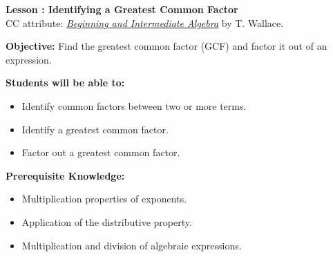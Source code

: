 \documentclass[12pt]{article}
\theoremstyle{definition}
\begin{document}
{\bf \large Lesson : Identifying a Greatest Common Factor}
\\ CC attribute: \href{http://www.wallace.ccfaculty.org/book/book.html}{\it{Beginning and Intermediate Algebra}} by T. Wallace. 
\hfill \doclicenseImage[imagewidth=5em]\\
\par
{\bf Objective:} Find the greatest common factor (GCF) and factor it out of an expression.\\
\par
{\bf Students will be able to:}
\begin{itemize}
	\item Identify common factors between two or more terms.
	\item Identify a greatest common factor.
	\item Factor out a greatest common factor.
\end{itemize}
{\bf Prerequisite Knowledge:}
\begin{itemize}
	\item Multiplication properties of exponents.
	\item Application of the distributive property.
	\item Multiplication and division of algebraic expressions.
\end{itemize}
\hrulefill
\end{document}
